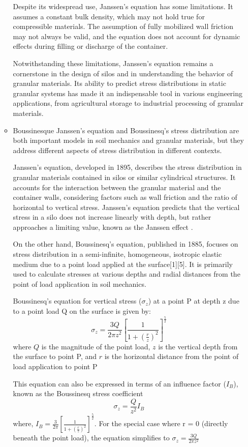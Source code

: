 \documentclass[xcolor=dvipsnames,10pt,hidelinks]{article}
\begin{document}
\begin{itemize}
\begin{itemize}
Despite its widespread use, Janssen's equation has some limitations.
It assumes a constant bulk density, which may not hold true for compressible materials.
The assumption of fully mobilized wall friction may not always be valid,
and the equation does not account for dynamic effects during filling or discharge of the container.

Notwithstanding these limitations, Janssen's equation remains a cornerstone in the design of silos and in understanding the behavior of granular materials.
Its ability to predict stress distributions in static granular systems has made it an indispensable tool in various engineering applications,
from agricultural storage to industrial processing of granular materials.

\item Boussinesque
Janssen's equation and Boussinesq's stress distribution are both important models in soil mechanics and granular materials,
but they address different aspects of stress distribution in different contexts.

Janssen's equation, developed in 1895, describes the stress distribution in granular materials contained in silos or similar cylindrical structures.
It accounts for the interaction between the granular material and the container walls,
considering factors such as wall friction and the ratio of horizontal to vertical stress.
Janssen's equation predicts that the vertical stress in a silo does not increase linearly with depth,
but rather approaches a limiting value, known as the Janssen effect \parencite{liu_experimental_2021}.

On the other hand, Boussinesq's equation, published in 1885,
focuses on stress distribution in a semi-infinite, homogeneous, isotropic elastic medium due to a point load applied at the surface[1][5].
It is primarily used to calculate stresses at various depths and radial distances from the point of load application in soil mechanics.

Boussinesq's equation for vertical stress (\(\sigma_z\)) at a point P at depth z due to a point load Q on the surface is given by:
\[ \sigma_z = \frac{3Q}{2\pi z^2} \left[ \frac{1}{1+\left(\frac{r}{z}\right)^2} \right]^{\frac{5}{2}} \]
where \(Q\) is the magnitude of the point load,
  \(z\) is the vertical depth from the surface to point P, and
  \(r\) is the horizontal distance from the point of load application to point P

This equation can also be expressed in terms of an influence factor (\(I_{B}\)), known as the Boussinesq stress coefficient
\[ \sigma_z = \frac{Q}{z^2} I_B \]
where, \(I_B = \frac{3}{2\pi} \left[ \frac{1}{1+\left(\frac{r}{z}\right)^2} \right]^{\frac{5}{2}}\).
For the special case where r = 0 (directly beneath the point load), the equation simplifies to \(\sigma_z = \frac{3Q}{2\pi z^2}\)


\end{itemize}
\end{itemize}
\end{document}
